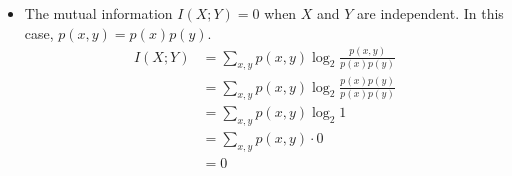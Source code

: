 \begin{itemize}
\begin{figure}[H]
    \end{figure}

    \item [(g)]
    The mutual information $I(X;Y)=0$ when $X$ and $Y$ are independent. In this case, $p(x, y) = p(x)p(y)$.
    \begin{align*}
        I(X;Y) &= \sum_{x,y} p(x,y) \log_2 \frac{p(x,y)}{p(x)p(y)}\\
        &= \sum_{x,y} p(x,y) \log_2 \frac{p(x)p(y)}{p(x)p(y)}\\
        &= \sum_{x,y} p(x,y) \log_2 1\\
        &= \sum_{x,y} p(x,y) \cdot 0\\
        &= 0
    \end{align*}
\end{itemize}












\newpage